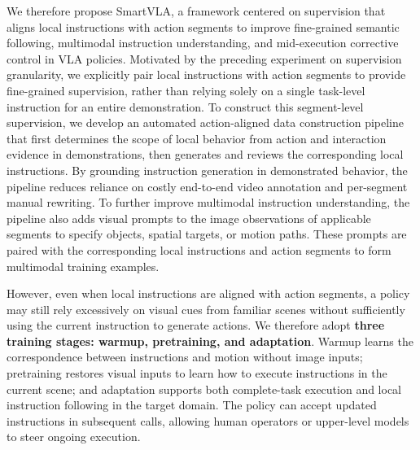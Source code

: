 



We therefore propose SmartVLA, a framework centered on supervision that aligns local instructions
with action segments to improve fine-grained semantic following, multimodal instruction
understanding, and mid-execution corrective control in VLA policies. Motivated by the preceding
experiment on supervision granularity, we explicitly pair local instructions with action segments to
provide fine-grained supervision, rather than relying solely on a single task-level instruction for
an entire demonstration. To construct this segment-level supervision, we develop an automated
action-aligned data construction pipeline that first determines the scope of local behavior from
action and interaction evidence in demonstrations, then generates and reviews the corresponding
local instructions. By grounding instruction generation in demonstrated behavior, the pipeline
reduces reliance on costly end-to-end video annotation and per-segment manual rewriting. To further
improve multimodal instruction understanding, the pipeline also adds visual prompts to the image
observations of applicable segments to specify objects, spatial targets, or motion paths. These
prompts are paired with the corresponding local instructions and action segments to form multimodal
training examples.

However, even when local instructions are aligned with action segments, a policy may still rely
excessively on visual cues from familiar scenes without sufficiently using the current instruction
to generate actions. We therefore adopt \textbf{three training stages: warmup, pretraining, and
adaptation}. Warmup learns the correspondence between instructions and motion without image inputs;
pretraining restores visual inputs to learn how to execute instructions in the current scene; and
adaptation supports both complete-task execution and local instruction following in the target
domain. The policy can accept updated instructions in subsequent calls, allowing human operators or
upper-level models to steer ongoing execution.



